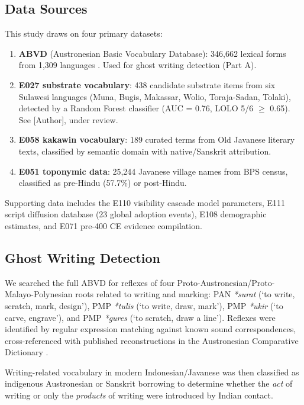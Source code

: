 \documentclass[12pt,a4paper]{article}
\begin{document}
\subsection{Data Sources}

This study draws on four primary datasets:

\begin{enumerate}
\item \textbf{ABVD} (Austronesian Basic Vocabulary Database): 346,662 lexical forms from 1,309 languages \citep{greenhill2008}. Used for ghost writing detection (Part A).
\item \textbf{E027 substrate vocabulary}: 438 candidate substrate items from six Sulawesi languages (Muna, Bugis, Makassar, Wolio, Toraja-Sadan, Tolaki), detected by a Random Forest classifier (AUC = 0.76, LOLO 5/6 $\geq$ 0.65). See [Author], under review.
\item \textbf{E058 kakawin vocabulary}: 189 curated terms from Old Javanese literary texts, classified by semantic domain with native/Sanskrit attribution.
\item \textbf{E051 toponymic data}: 25,244 Javanese village names from BPS census, classified as pre-Hindu (57.7\%) or post-Hindu.
\end{enumerate}

Supporting data includes the E110 visibility cascade model parameters, E111 script diffusion database (23 global adoption events), E108 demographic estimates, and E071 pre-400 CE evidence compilation.

\subsection{Ghost Writing Detection}

We searched the full ABVD for reflexes of four Proto-Austronesian/Proto-Malayo-Polynesian roots related to writing and marking: PAN \textit{*surat} (`to write, scratch, mark, design'), PMP \textit{*tulis} (`to write, draw, mark'), PMP \textit{*ukir} (`to carve, engrave'), and PMP \textit{*gures} (`to scratch, draw a line'). Reflexes were identified by regular expression matching against known sound correspondences, cross-referenced with published reconstructions in the Austronesian Comparative Dictionary \citep{blust_acd}.

Writing-related vocabulary in modern Indonesian/Javanese was then classified as indigenous Austronesian or Sanskrit borrowing to determine whether the \textit{act} of writing or only the \textit{products} of writing were introduced by Indian contact.
\end{document}
